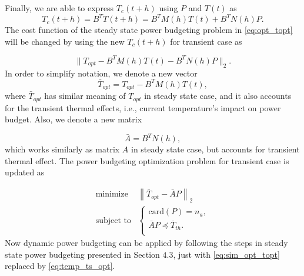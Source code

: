 Finally, we are able to express $T_c(t+h)$ using $P$ and $T(t)$ as
\begin{equation}
T_c(t+h) = B^{T}T(t+h)= B^{T}M(h)T(t)+B^{T}N(h)P.
\end{equation}
The cost function of the steady state power budgeting problem in
\eqref{eq:opt_topt} will be changed by using the new $T_c(t+h)$ for
transient case as

\begin{equation}\label{eq:cost_trans}
\|T_{opt} - B^{T}M(h)T(t) - B^{T}N(h)P \|_2.
\end{equation}
In order to simplify notation, we denote a new vector  
\begin{equation}
\bar{T}_{opt}=T_{opt} - B^{T}M(h)T(t),
\end{equation}
where $\bar{T}_{opt}$ has similar meaning of
$T_{opt}$ in steady state case, and it also accounts for the transient
thermal effects, i.e., current temperature's impact on power
budget. Also, we denote a new matrix 

\begin{equation}
\bar{A} = B^{T}N(h), 
\end{equation}
which works similarly as matrix $A$ in steady
state case, but accounts for transient thermal effect. The power
budgeting optimization problem for transient case is updated as 




\begin{equation}\label{eq:temp_ts_opt}
\begin{split}
\text{minimize } &  \left \| \bar{T}_{opt}-\bar{A}P \right \|_{2}\\
\text{subject to} &\left\{
\begin{array}{lr}
\text{card}(P) = n_{a},\\
\bar{A}P \preceq \bar{T}_{th}.\\
\end{array}
\right.
\end{split}
\end{equation}
Now dynamic power budgeting can be
applied by following the steps in steady state power budgeting presented in
Section $4.3$, just with \eqref{eq:sim_opt_topt} replaced
by \eqref{eq:temp_ts_opt}.